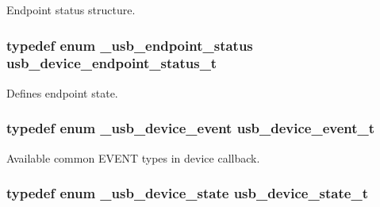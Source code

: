 Endpoint status structure. 

\hypertarget{group__usb__device__driver_gaaefd48322932e1e70d5c4b4674e19796}{
\subsubsection[{usb\-\_\-device\-\_\-endpoint\-\_\-status\-\_\-t}]{\setlength{\rightskip}{0pt plus 5cm}typedef enum {\bf \-\_\-usb\-\_\-endpoint\-\_\-status}  {\bf usb\-\_\-device\-\_\-endpoint\-\_\-status\-\_\-t}}}\label{group__usb__device__driver_gaaefd48322932e1e70d5c4b4674e19796}


Defines endpoint state. 

\hypertarget{group__usb__device__driver_ga35623b5263f88037a497e6c6c363b8f1}{
\subsubsection[{usb\-\_\-device\-\_\-event\-\_\-t}]{\setlength{\rightskip}{0pt plus 5cm}typedef enum {\bf \-\_\-usb\-\_\-device\-\_\-event}  {\bf usb\-\_\-device\-\_\-event\-\_\-t}}}\label{group__usb__device__driver_ga35623b5263f88037a497e6c6c363b8f1}


Available common E\-V\-E\-N\-T types in device callback. 

\hypertarget{group__usb__device__driver_gadb6af69c6a5a2124b197210e41ed8256}{
\subsubsection[{usb\-\_\-device\-\_\-state\-\_\-t}]{\setlength{\rightskip}{0pt plus 5cm}typedef enum {\bf \-\_\-usb\-\_\-device\-\_\-state}  {\bf usb\-\_\-device\-\_\-state\-\_\-t}}}\label{group__usb__device__driver_gadb6af69c6a5a2124b197210e41ed8256}


